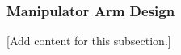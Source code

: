 
\subsubsection{Manipulator Arm Design}
\label{subsubsec:design_3_4_manipulator_arm_design}

[Add content for this subsection.]
